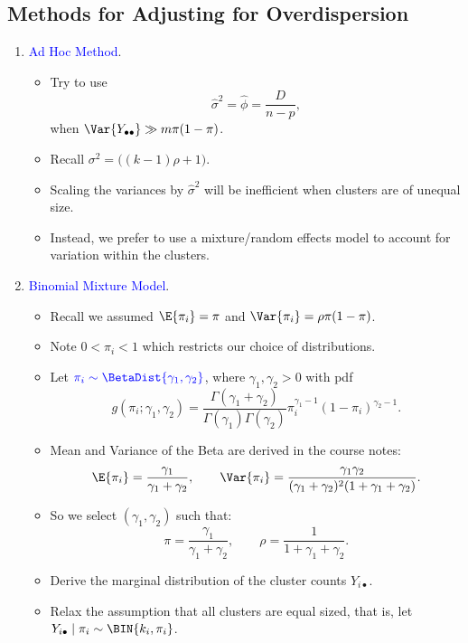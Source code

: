 \documentclass[oneside]{book}\usepackage[]{graphicx}\usepackage[svgnames]{xcolor}
\begin{document}
\subsection*{Methods for Adjusting for Overdispersion}
\begin{enumerate}[1.]
    \item \textcolor{Blue}{Ad Hoc Method}.
          \begin{itemize}
              \item Try to use
                    \[ \hat{\sigma}^2=\hat{\phi}=\frac{D}{n-p}, \]
                    when $ \Var{Y_{\bullet\bullet}}\gg m\pi(1-\pi) $.
              \item Recall $ \sigma^2=\bigl((k-1)\rho+1\bigr) $.
              \item Scaling the variances by $ \hat{\sigma}^2 $ will be inefficient when clusters are of unequal size.
              \item Instead, we prefer to use a mixture/random effects model to account for variation
                    within the clusters.
          \end{itemize}
    \item \textcolor{Blue}{Binomial Mixture Model}.
          \begin{itemize}
              \item Recall we assumed $ \E{\pi_i}=\pi $ and $ \Var{\pi_i}=\rho\pi(1-\pi) $.
              \item Note $ 0<\pi_i<1 $ which restricts our choice of distributions.
              \item Let $ \textcolor{Blue}{\pi_i \sim \BetaDist{\gamma_1,\gamma_2}} $, where $ \gamma_1,\gamma_2>0 $ with pdf
                    \[ g(\pi_i;\gamma_1,\gamma_2)=\frac{\Gamma(\gamma_1+\gamma_2)}{\Gamma(\gamma_1)\Gamma(\gamma_2)}\pi_i^{\gamma_1-1}(1-\pi_i)^{\gamma_2-1}. \]
              \item Mean and Variance of the Beta are derived in the course notes:
                    \[ \E{\pi_i}=\frac{\gamma_1}{\gamma_1+\gamma_2},\qquad \Var{\pi_i}=\frac{\gamma_1\gamma_2}{(\gamma_1+\gamma_2)^2(1+\gamma_1+\gamma_2)}. \]
              \item So we select $ (\gamma_1,\gamma_2) $ such that:
                    \[ \pi=\frac{\gamma_1}{\gamma_1+\gamma_2},\qquad \rho=\frac{1}{1+\gamma_1+\gamma_2}. \]
              \item Derive the marginal distribution of the cluster counts $ Y_{i\bullet} $.
              \item Relax the assumption that all clusters are equal sized, that is, let $ Y_{i\bullet}\mid \pi_i \sim \BIN{k_i,\pi_i} $.

\end{itemize}
\end{enumerate}
\end{document}
